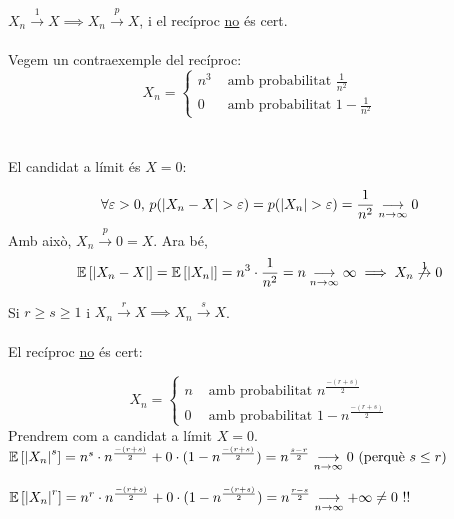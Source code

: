 \begin{prop}[(II)]
  $X_n \overset{1}{\to} X \implies X_n \overset{p}{\to} X$, i el recíproc \underline{no} és cert. \\\\
  
  Vegem un contraexemple del recíproc: \\
  
  \[
    X_n = \begin{cases}
      n^3 &\text{ amb probabilitat } \frac{1}{n^2} \\
      0   &\text{ amb probabilitat } 1 - \frac{1}{n^2}
    \end{cases}
  \]
  \-\\\\
  
  
  El candidat a límit és $X=0$:
  
  \[ 
    \forall \varepsilon > 0, \, p(\left\vert X_n - X \right\vert > \varepsilon) = p(\left\vert X_n \right\vert > \varepsilon) = 
    \frac{1}{n^2} \underset{n\to \infty}{\longrightarrow} 0
  \]
  Amb això, $X_n \overset{p}{\to} 0 = X$. Ara bé,
  \[
    \mathbb{E}\left[\left\vert X_n - X \right\vert\right] = \mathbb{E}\left[\left\vert X_n \right\vert\right] = n^3 \cdot \frac{1}{n^2} = 
    n \underset{n \to \infty}{\longrightarrow} \infty \implies X_n \not\overset{1}{\to} 0
  \]
\end{prop}

\begin{prop}[(III)]
  Si $r\geq s \geq 1$ i $ X_n \overset{r}{\to} X \implies X_n \overset{s}{\to} X$.\\\\
  
  El recíproc \underline{no} és cert:
  
  \[
    X_n = \begin{cases}
      n &\text{ amb probabilitat } n^{\frac{-(r+s)}{2}} \\
      0 &\text{ amb probabilitat } 1 - n^{\frac{-(r+s)}{2}}
    \end{cases} 
  \]
  Prendrem com a candidat a límit $X=0$.\\
  
  $\mathbb{E}\left[\left\vert X_n \right\vert^s \right] = n^s \cdot n^{\frac{-(r+s)}{2}} + 0\cdot (1 - n^{\frac{-(r+s)}{2}}) = 
  n^{\frac{s-r}{2}} \underset{n \to \infty}{\longrightarrow} 0 \text{ (perquè } s \leq r)$
  
  $\mathbb{E}\left[\left\vert X_n \right\vert^r \right] = n^r \cdot n^{\frac{-(r+s)}{2}} + 0\cdot (1 - n^{\frac{-(r+s)}{2}}) = 
  n^{\frac{r-s}{2}} \underset{n \to \infty}{\longrightarrow} +\infty \not= 0 \text{ !!}$
\end{prop}

